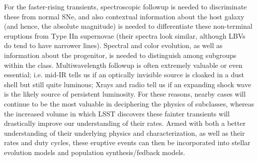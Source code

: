 For the faster-rising transients, spectroscopic followup is needed to
discriminate these from normal SNe, and also contextual information
about the host galaxy (and hence, the absolute magnitude) is needed to
differentiate these non-terminal eruptions from Type IIn supernovae
(their spectra look similar, although LBVs do tend to have narrower
lines).  Spectral and color evolution, as well as information about
the progenitor, is needed to distinguish among subgroups within the
class.  Multiwavelength followup is often extremely valuable or even
essential; i.e. mid-IR tells us if an optically invisible source is
cloaked in a dust shell but still quite luminous; Xrays and radio tell
us if an expanding shock wave is the likely source of persistent
luminosity.  For these reasons, nearby cases will continue to be the
most valuable in deciphering the physics of subclasses, whereas the
increased volume in which LSST discovers these fainter transients will
drastically improve our understanding of their rates.  Armed with both
a better understanding of their underlying physics and
characterization, as well as their rates and duty cycles, these
eruptive events can then be incorporated into stellar evolution models
and population synthesis/fedback models.
